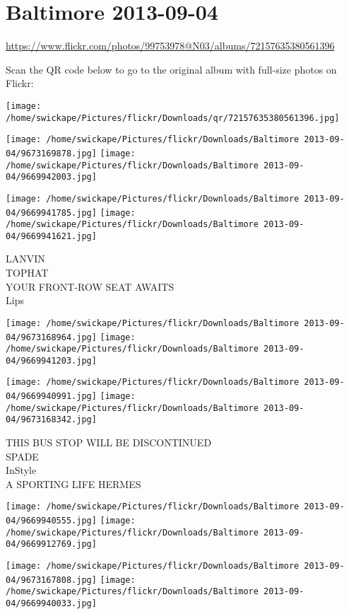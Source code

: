 \documentclass[10pt,letterpaper]{article}
\title{}
\author{}
\date{}
\begin{document}
\section*{Baltimore 2013-09-04}

\url{https://www.flickr.com/photos/99753978@N03/albums/72157635380561396}

Scan the QR code below to go to the original album with full-size photos on Flickr:

\texttt{[image: /home/swickape/Pictures/flickr/Downloads/qr/72157635380561396.jpg]}
\pagebreak

\texttt{[image: /home/swickape/Pictures/flickr/Downloads/Baltimore 2013-09-04/9673169878.jpg]}
\texttt{[image: /home/swickape/Pictures/flickr/Downloads/Baltimore 2013-09-04/9669942003.jpg]}

\texttt{[image: /home/swickape/Pictures/flickr/Downloads/Baltimore 2013-09-04/9669941785.jpg]}
\texttt{[image: /home/swickape/Pictures/flickr/Downloads/Baltimore 2013-09-04/9669941621.jpg]}

LANVIN\\
TOPHAT\\
YOUR FRONT{-}ROW SEAT AWAITS\\
Lips
\pagebreak

\texttt{[image: /home/swickape/Pictures/flickr/Downloads/Baltimore 2013-09-04/9673168964.jpg]}
\texttt{[image: /home/swickape/Pictures/flickr/Downloads/Baltimore 2013-09-04/9669941203.jpg]}

\texttt{[image: /home/swickape/Pictures/flickr/Downloads/Baltimore 2013-09-04/9669940991.jpg]}
\texttt{[image: /home/swickape/Pictures/flickr/Downloads/Baltimore 2013-09-04/9673168342.jpg]}

THIS BUS STOP WILL BE DISCONTINUED\\
SPADE\\
InStyle\\
A SPORTING LIFE HERMES
\pagebreak

\texttt{[image: /home/swickape/Pictures/flickr/Downloads/Baltimore 2013-09-04/9669940555.jpg]}
\texttt{[image: /home/swickape/Pictures/flickr/Downloads/Baltimore 2013-09-04/9669912769.jpg]}

\texttt{[image: /home/swickape/Pictures/flickr/Downloads/Baltimore 2013-09-04/9673167808.jpg]}
\texttt{[image: /home/swickape/Pictures/flickr/Downloads/Baltimore 2013-09-04/9669940033.jpg]}
\end{document}
